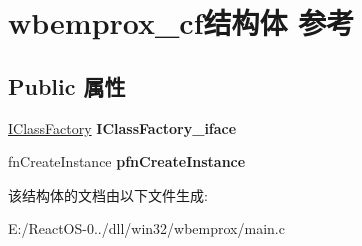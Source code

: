 \hypertarget{structwbemprox__cf}{}\section{wbemprox\+\_\+cf结构体 参考}
\label{structwbemprox__cf}
\subsection*{Public 属性}
\begin{DoxyCompactItemize}
\item 
\mbox{\label{structwbemprox__cf_a3fbc52f05b3ee2d18ad9edb8e9ca1844}} 
\hyperlink{interface_i_class_factory}{I\+Class\+Factory} {\bfseries I\+Class\+Factory\+\_\+iface}
\item 
\mbox{\label{structwbemprox__cf_a7934a954f53b8a4c9ddfa3781246ab5d}} 
fn\+Create\+Instance {\bfseries pfn\+Create\+Instance}
\end{DoxyCompactItemize}


该结构体的文档由以下文件生成\+:\begin{DoxyCompactItemize}
\item 
E\+:/\+React\+O\+S-\/0../dll/win32/wbemprox/main.\+c\end{DoxyCompactItemize}
